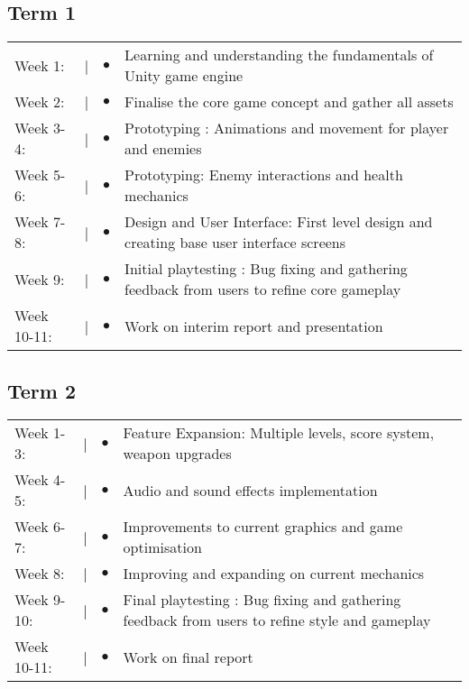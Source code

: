\documentclass[12pt]{article}
\begin{document}
\subsection{Term 1}
\begin{tabular}{@{}p{2cm}@{}>{\raggedright\arraybackslash}p{0.5cm}@{}>{\raggedright\arraybackslash}p{0.5cm}@{}p{12cm}}
Week 1: & \textcolor{black}{|} & $\bullet$ & Learning and understanding the fundamentals of Unity game engine \\
Week 2: & \textcolor{black}{|} & $\bullet$ & Finalise the core game concept and gather all assets \\
Week 3-4: & \textcolor{black}{|} & $\bullet$ & Prototyping : Animations and movement for player and enemies\\
Week 5-6: & \textcolor{black}{|} & $\bullet$ &  Prototyping: Enemy interactions and health mechanics \\
Week 7-8: & \textcolor{black}{|} & $\bullet$ & Design and User Interface: First level design and creating base user interface screens\\
Week 9: & \textcolor{black}{|} & $\bullet$ & Initial playtesting : Bug fixing and gathering feedback from users to refine core gameplay\\
Week 10-11: & \textcolor{black}{|} & $\bullet$ & Work on interim report and presentation \\
\end{tabular}

\subsection{Term 2}
\begin{tabular}{@{}p{2cm}@{}>{\raggedright\arraybackslash}p{0.5cm}@{}>{\raggedright\arraybackslash}p{0.5cm}@{}p{12cm}}
Week 1-3: & \textcolor{black}{|} & $\bullet$ & Feature Expansion: Multiple levels, score system, weapon upgrades\\
Week 4-5: & \textcolor{black}{|} & $\bullet$ & Audio and sound effects implementation \\
Week 6-7: & \textcolor{black}{|} & $\bullet$ &  Improvements to current graphics and game optimisation \\
Week 8: & \textcolor{black}{|} & $\bullet$ & Improving and expanding on current mechanics \\
Week 9-10: & \textcolor{black}{|} & $\bullet$ & Final playtesting : Bug fixing and gathering feedback from users to refine style and gameplay\\
Week 10-11: & \textcolor{black}{|} & $\bullet$ & Work on final report \\
\end{tabular}
\end{document}
